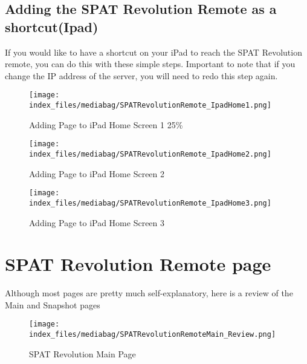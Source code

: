 \documentclass[
  letterpaper,
  DIV=11,
  numbers=noendperiod]{scrreport}
\begin{document}
\hypertarget{adding-the-spat-revolution-remote-as-a-shortcutipad}{%
\subsection{Adding the SPAT Revolution Remote as a
shortcut(Ipad)}\label{adding-the-spat-revolution-remote-as-a-shortcutipad}}

If you would like to have a shortcut on your iPad to reach the SPAT
Revolution remote, you can do this with these simple steps. Important to
note that if you change the IP address of the server, you will need to
redo this step again.

\begin{figure}

{\centering \texttt{[image: index\_files/mediabag/SPATRevolutionRemote\_IpadHome1.png]}

}

\caption{Adding Page to iPad Home Screen 1 25\%}

\end{figure}

\begin{figure}

{\centering \texttt{[image: index\_files/mediabag/SPATRevolutionRemote\_IpadHome2.png]}

}

\caption{Adding Page to iPad Home Screen 2}

\end{figure}

\begin{figure}

{\centering \texttt{[image: index\_files/mediabag/SPATRevolutionRemote\_IpadHome3.png]}

}

\caption{Adding Page to iPad Home Screen 3}

\end{figure}

\hypertarget{spat-revolution-remote-page}{%
\section{SPAT Revolution Remote
page}\label{spat-revolution-remote-page}}

Although most pages are pretty much self-explanatory, here is a review
of the Main and Snapshot pages

\begin{figure}

{\centering \texttt{[image: index\_files/mediabag/SPATRevolutionRemoteMain\_Review.png]}

}

\caption{SPAT Revolution Main Page}

\end{figure}
\end{document}

